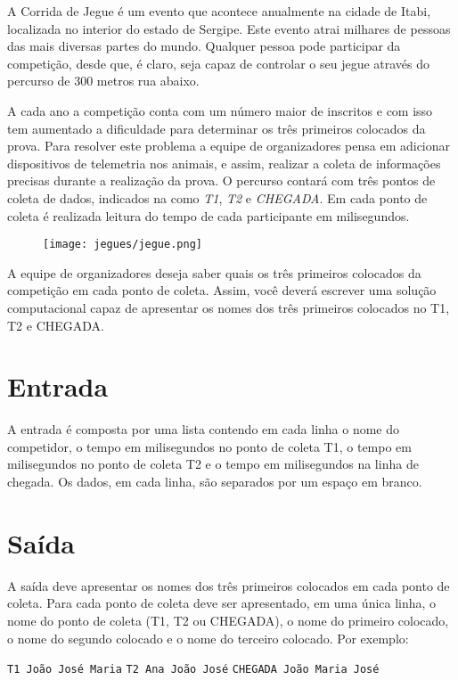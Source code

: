 
A Corrida de Jegue é um evento que acontece anualmente na cidade de Itabi, localizada no interior do estado de Sergipe. Este evento atrai milhares de pessoas das mais diversas partes do mundo. Qualquer pessoa pode participar da competição, desde que, é claro, seja capaz de controlar o seu jegue através do percurso de 300 metros rua abaixo. 

A cada ano a competição conta com um número maior de inscritos e com isso tem aumentado a dificuldade para determinar os três primeiros colocados da prova. Para resolver este problema a equipe de organizadores pensa em adicionar dispositivos de telemetria nos animais, e assim, realizar a coleta de informações precisas durante a realização da prova. O percurso contará com três pontos de coleta de dados, indicados na como \textit{T1}, \textit{T2} e \textit{CHEGADA}. Em cada ponto de coleta é realizada leitura do tempo de cada participante em milisegundos.

\begin{figure}[h!]
	\centering
    \texttt{[image: jegues/jegue.png]}
\end{figure}

A equipe de organizadores deseja saber quais os três primeiros colocados da competição em cada ponto de coleta. Assim, você deverá escrever uma solução computacional capaz de apresentar os nomes dos três primeiros colocados no T1, T2 e CHEGADA.

\section*{Entrada}

A entrada é composta por uma lista contendo em cada linha o nome do competidor, o tempo em milisegundos no ponto de coleta T1, o tempo em milisegundos no ponto de coleta T2 e o tempo em milisegundos na linha de chegada. Os dados, em cada linha, são separados por um espaço em branco.


\section*{Saída}

A saída deve apresentar os nomes dos três primeiros colocados em cada ponto de coleta. Para cada ponto de coleta deve ser apresentado, em uma única  linha, o nome do ponto de coleta (T1, T2 ou CHEGADA), o nome do primeiro colocado, o nome do segundo colocado e o nome do terceiro colocado. Por exemplo:

\texttt{T1 João José Maria} \linebreak 
\texttt{T2 Ana João José} \linebreak 
\texttt{CHEGADA João Maria José} \linebreak 

